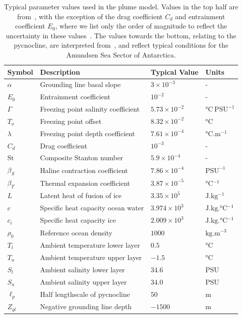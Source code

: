 \documentclass[openacc]{rsproca_new}%
\begin{document}
\begin{table}[!h]
\caption{Typical parameter values used in the plume model. Values in the top half are from~\cite{Jenkins1991JGeophysResOceans}, with the exception of the drag coefficient $C_d$ and entrainment coefficient $E_0$, where we list only the order of magnitude to reflect the uncertainty in these values~\cite{Hewitt2020AnnRevFlu}. The values towards the bottom, relating to the pycnocline, are interpreted from~\cite{Jenkins2018NatureGeo}, and reflect typical conditions for the Amundsen Sea Sector of Antarctica.}\label{T:Constants}
\begin{center}
\begin{tabular}{llll}%
\hline
Symbol & Description & Typical Value & Units \\
\hline
$\alpha$ &Grounding line basal slope &$3\times 10^{-3}$ &- \\
$E_0$   & Entrainment coefficient    & $10^{-2}$ & -       \\
$\Gamma$      & Freezing point salinity coefficient & $5.73 \times 10^{-2}	$    	  &  $\si{\celsius}~\text{PSU}^{-1}$     \\
$T_o$      & Freezing point offset & $8.32 \times 10^{-2}	$    	  &  $\si{ \celsius}$     \\
$\lambda$      & Freezing point depth coefficient & $7.61 \times 10^{-4}	$    	  &  $\si{\celsius . \meter^{-1}}$     \\
$C_d$ & Drag coefficient & $10^{-3}$ & - \\
$\mathrm{St}$ & Composite Stanton number & $5.9 \times 10^{-4}$ & -\\
$\beta_S$ & Haline contraction coefficient & $7.86 \times 10^{-4} $ & $\text{PSU}^{-1}$ \\
$\beta_T$ & Thermal expansion coefficient & $3.87\times 10^{-5}$ & $\si{\celsius^{-1}}$ \\
$L$ & Latent heat of fusion of ice & $3.35 \times 10^5 $& $\si{\joule . \kg^{-1}}$\\
$c$ & Specific heat capacity ocean water & $3.974 \times 10^3$ & $\si{\joule .\kilogram .\celsius^{-1}}$\\
$c_i$ & Specific heat capacity ice & $2.009 \times 10^3$ & $\si{\joule . \kilogram .\celsius^{-1}}$\\

$\rho_0$ &  Reference ocean density & $1000$ & $\si{\kilogram . \meter^{-3}}$\\
$T_{l}$ & Ambient temperature lower layer &$0.5$        &  $\si{ \celsius}$   \\
$T_{u}$ & Ambient temperature upper layer &$-1.5$        &  $\si{ \celsius}$  \\
$S_{l}$ & Ambient salinity lower layer &$34.6$        &  $\text{PSU}$   \\
$S_{u}$ & Ambient salinity upper layer &$34.0$        &  $\text{PSU}$  \\
$\ell_p$ & Half lengthscale of pycnocline & $50$ & $\si{\meter}$\\
$Z_{gl}$ & Negative grounding line depth & $-1500$ & $\si{\meter}$\\


\end{tabular}
\end{center}
\end{table}
\end{document}
